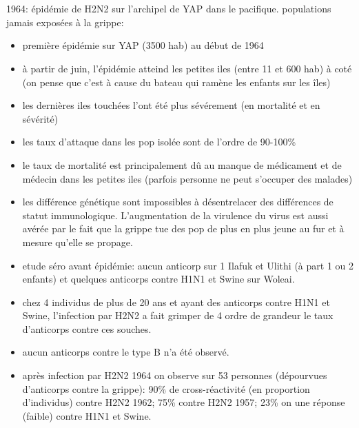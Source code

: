 \documentclass{article}
\begin{document}
\section{\cite{Brown1966}}
1964: épidémie de H2N2 sur l'archipel de YAP dans le pacifique. populations jamais exposées à la grippe:
\begin{itemize}
\item première épidémie sur YAP (3500 hab) au début de 1964
\item à partir de juin, l'épidémie atteind les petites iles (entre 11 et 600 hab) à coté (on pense que c'est à cause du bateau qui ramène les enfants sur les îles)
\item les dernières iles touchées l'ont été plus sévérement (en mortalité et en sévérité)
\item les taux d'attaque dans les pop isolée sont de l'ordre de 90-100\%
\item le taux de mortalité est principalement dû au manque de médicament et de médecin dans les petites iles (parfois personne ne peut s'occuper des malades)
\item les différence génétique sont impossibles à désentrelacer des différences de statut immunologique. L'augmentation de la virulence du virus est aussi avérée par le fait que la grippe tue des pop de plus en plus jeune au fur et à mesure qu'elle se propage.
\item etude séro avant épidémie: aucun anticorp sur 1 Ilafuk et Ulithi (à part 1 ou 2 enfants) et quelques anticorps contre H1N1 et Swine sur Woleai.
\item chez 4 individus de plus de 20 ans et ayant des anticorps contre H1N1 et Swine, l'infection par H2N2 a fait grimper de 4 ordre de grandeur le taux d'anticorps contre ces souches.
\item aucun anticorps contre le type B n'a été observé.
\item après infection par H2N2 1964 on observe sur 53 personnes (dépourvues d'anticorps contre la grippe): 90\% de cross-réactivité (en proportion d'individus) contre H2N2 1962; 75\% contre H2N2 1957; 23\% on une réponse (faible) contre H1N1 et Swine.
\end{itemize}
\end{document}
